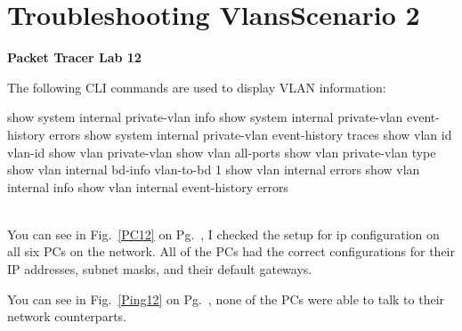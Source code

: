 \documentclass[../EngineeringJournal_CDavis.tex]{subfiles}
\begin{document}

\chapter[Troubleshooting Vlans Scenario 2]{Troubleshooting Vlans\linebreak[1]
Scenario 2 \hspace*{\fill March 2, 2020}}
\noindent\textbf{{Packet Tracer Lab 12} }                             


\hspace{0.2cm}
\begin{tcolorbox}[width=6.3in]
The following CLI commands are used to display VLAN information:
\scriptsize 
  \begin{outline}
    \1 show system internal private-vlan info
    \1 show system internal private-vlan event-history errors
    \1 show system internal private-vlan event-history traces
    \1 show vlan id vlan-id
    \1 show vlan private-vlan
    \1 show vlan all-ports
    \1 show vlan private-vlan type
    \1 show vlan internal bd-info vlan-to-bd 1
    \1 show vlan internal errors
    \1 show vlan internal info
    \1 show vlan internal event-history errors
  \end{outline}
\end{tcolorbox}
\hspace{0.2cm}
\normalsize  
  
\clearpage


\\
You can see in Fig.~\ref{PC12} on Pg.~\pageref{PC12},
I checked the setup for ip configuration on all six PCs on the network. 
All of the PCs had the correct configurations for their IP addresses, subnet
masks, and their default gateways.\hfill\break 

\noindent You can see in Fig.~\ref{Ping12} on Pg.~\pageref{Ping12}, 
none of the PCs were able to talk to their network counterparts.
\end{document}
